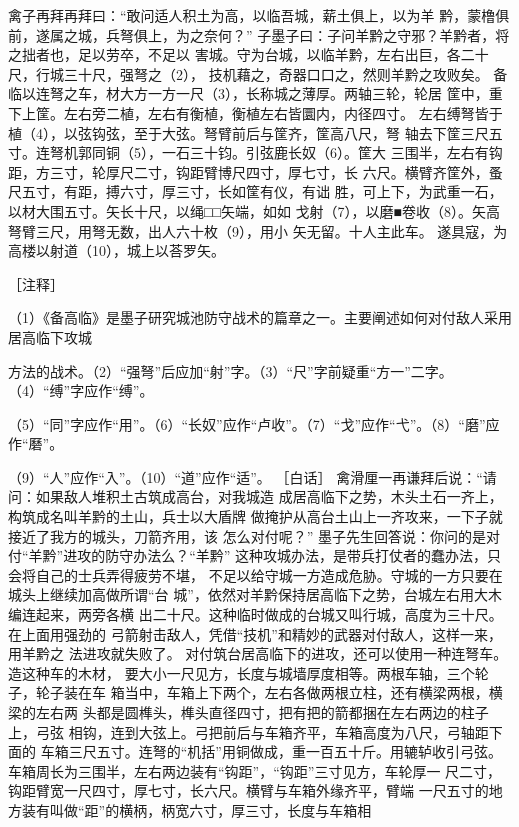 \documentclass[12pt,UTF8]{ctexbook}
\begin{document}
禽子再拜再拜曰：“敢问适人积土为高，以临吾城，薪土俱上，以为羊 
黔，蒙橹俱前，遂属之城，兵弩俱上，为之奈何？” 
子墨子曰：子问羊黔之守邪？羊黔者，将之拙者也，足以劳卒，不足以 
害城。守为台城，以临羊黔，左右出巨，各二十尺，行城三十尺，强弩之（2）， 
技机藉之，奇器口口之，然则羊黔之攻败矣。 
备临以连弩之车，材大方一方一尺（3），长称城之薄厚。两轴三轮，轮居 
筐中，重下上筐。左右旁二植，左右有衡植，衡植左右皆圜内，内径四寸。 
左右缚弩皆于植（4），以弦钩弦，至于大弦。弩臂前后与筐齐，筐高八尺，弩 
轴去下筐三尺五寸。连弩机郭同铜（5），一石三十钧。引弦鹿长奴（6）。筐大 
三围半，左右有钩距，方三寸，轮厚尺二寸，钩距臂博尺四寸，厚七寸，长 
六尺。横臂齐筐外，蚤尺五寸，有距，搏六寸，厚三寸，长如筐有仪，有诎 
胜，可上下，为武重一石，以材大围五寸。矢长十尺，以绳□□矢端，如如 
戈射（7），以磨■卷收（8）。矢高弩臂三尺，用弩无数，出人六十枚（9），用小 
矢无留。十人主此车。 
遂具寇，为高楼以射道（10），城上以荅罗矢。 


［注释］ 

（1）《备高临》是墨子研究城池防守战术的篇章之一。主要阐述如何对付敌人采用居高临下攻城 

方法的战术。（2）“强弩”后应加“射”字。（3）“尺”字前疑重“方一”二字。（4）“缚”字应作“缚”。 

（5）“同”字应作“用”。（6）“长奴”应作“卢收”。（7）“戈”应作“弋”。（8）“磨”应作“磿”。 

（9）“人”应作“入”。（10）“道”应作“适”。 
［白话］ 
禽滑厘一再谦拜后说：“请问：如果敌人堆积土古筑成高台，对我城造 
成居高临下之势，木头土石一齐上，构筑成名叫羊黔的土山，兵士以大盾牌 
做掩护从高台土山上一齐攻来，一下子就接近了我方的城头，刀箭齐用，该 
怎么对付呢？” 
墨子先生回答说：你问的是对付“羊黔”进攻的防守办法么？“羊黔” 
这种攻城办法，是带兵打仗者的蠢办法，只会将自己的士兵弄得疲劳不堪， 
不足以给守城一方造成危胁。守城的一方只要在城头上继续加高做所谓“台 
城”，依然对羊黔保持居高临下之势，台城左右用大木编连起来，两旁各横 
出二十尺。这种临时做成的台城又叫行城，高度为三十尺。在上面用强劲的 
弓箭射击敌人，凭借“技机”和精妙的武器对付敌人，这样一来，用羊黔之 
法进攻就失败了。 
对付筑台居高临下的进攻，还可以使用一种连弩车。造这种车的木材， 
要大小一尺见方，长度与城墙厚度相等。两根车轴，三个轮子，轮子装在车 
箱当中，车箱上下两个，左右各做两根立柱，还有横梁两根，横梁的左右两 
头都是圆榫头，榫头直径四寸，把有把的箭都捆在左右两边的柱子上，弓弦 
相钩，连到大弦上。弓把前后与车箱齐平，车箱高度为八尺，弓轴距下面的 
车箱三尺五寸。连弩的“机括”用铜做成，重一百五十斤。用辘轳收引弓弦。 
车箱周长为三围半，左右两边装有“钩距”，“钩距”三寸见方，车轮厚一 
尺二寸，钩距臂宽一尺四寸，厚七寸，长六尺。横臂与车箱外缘齐平，臂端 
一尺五寸的地方装有叫做“距”的横柄，柄宽六寸，厚三寸，长度与车箱相 
\end{document}
